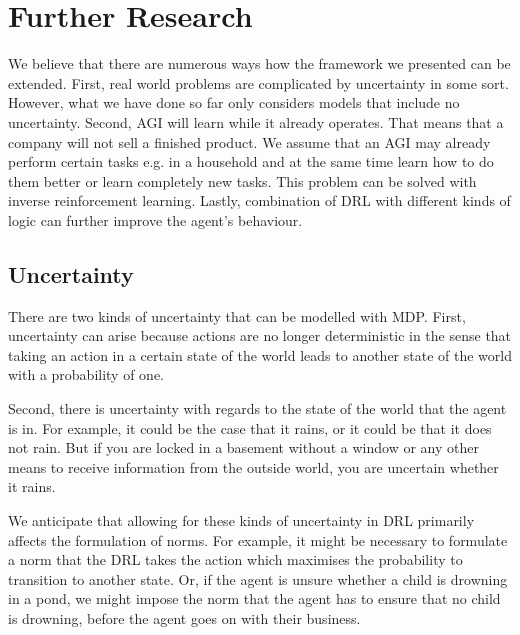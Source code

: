 \section{Further Research}
\label{sec:further}

We believe that there are numerous ways how the framework we presented can be extended. First, real world problems are complicated by uncertainty in some sort. However, what we have done so far only considers models that include no uncertainty. Second, AGI will learn while it already operates. That means that a company will not sell a finished product. We assume that an AGI may already perform certain tasks e.g. in a household and at the same time learn how to do them better or learn completely new tasks. This problem can be solved with inverse reinforcement learning. Lastly, combination of DRL with different kinds of logic can further improve the agent's behaviour.

\subsection{Uncertainty}
There are two kinds of uncertainty that can be modelled with MDP. First, uncertainty can arise because actions are no longer deterministic in the sense that taking an action in a certain state of the world leads to another state of the world with a probability of one.  

Second, there is uncertainty with regards to the state of the world that the agent is in. For example, it could be the case that it rains, or it could be that it does not rain. But if you are locked in a basement without a window or any other means to receive information from the outside world, you are uncertain whether it rains. 

We anticipate that allowing for these kinds of uncertainty in DRL primarily affects the formulation of norms. For example, it might be necessary to formulate a norm that the DRL takes the action which maximises the probability to transition to another state. Or, if the agent is unsure whether a child is drowning in a pond, we might impose the norm that the agent has to ensure that no child is drowning, before the agent goes on with their business. 

